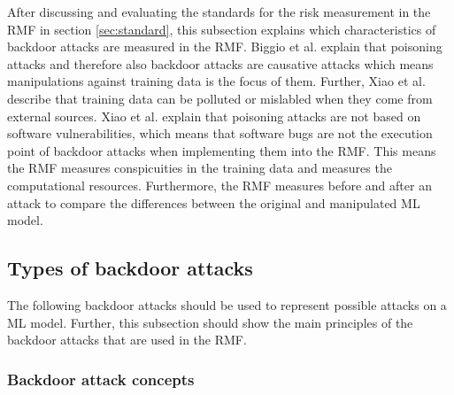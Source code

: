 After discussing and evaluating the standards for the risk measurement in the RMF in section \ref{sec:standard}, this subsection explains which characteristics of backdoor attacks are measured in the
RMF. Biggio et al. \cite{DBLP:conf/icml/BiggioNL12} explain that poisoning attacks and therefore also backdoor attacks are causative attacks which means manipulations against training data is the focus of them. Further, Xiao et al. \cite{DBLP:conf/sp/XiaoLZX18} describe that training data can be polluted or mislabled when they come from external sources. Xiao et al. explain that poisoning attacks are not based on software vulnerabilities, which means that software bugs are not the execution point of backdoor attacks when implementing them into the RMF. This means the RMF measures conspicuities in the training data and measures the computational resources. Furthermore, the RMF measures before and after an attack to compare the differences between the original and manipulated ML model.

\subsection{Types of backdoor attacks}
\label{sec:backdoor_types}

The following backdoor attacks should be used to represent possible attacks on a ML model. Further, this subsection should show the main principles of the backdoor attacks that are used in the RMF.

\subsubsection*{Backdoor attack concepts}

